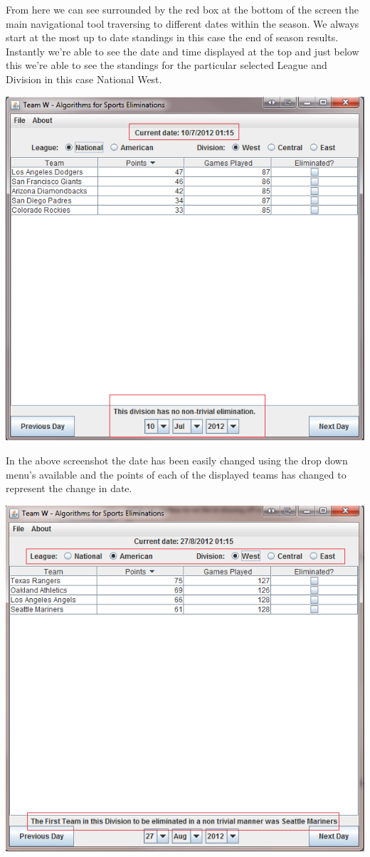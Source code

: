 From here we can see surrounded by the red box at the bottom of the screen the main navigational tool traversing to different dates within the season. We always start at the most up to date standings in this case the end of season results. Instantly we're able to see the date and time displayed at the top and just below this we're able to see the standings for the particular selected League and Division in this case National West.

\includegraphics[width=\linewidth,keepaspectratio]{images/userManualDesk2.png}

In the above screenshot the date has been easily changed using the drop down menu's available and the points of each of the displayed teams has changed to represent the change in date.

\includegraphics[width=\linewidth,keepaspectratio]{images/userManualDesk3.png}

